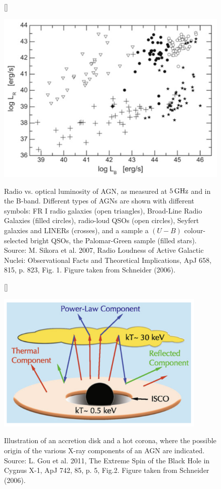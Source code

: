 \documentclass[a4paper,11pt]{article}
\begin{document}
\begin{figure}[h]
    [\FBwidth]
    {\caption{\footnotesize{Radio vs. optical luminosity of AGN, as measured at $5\,{\rm GHz}$ and in the B-band. Different types of AGNs are shown with different symbols: FR I radio galaxies (open triangles), Broad-Line Radio Galaxies (filled circles), radio-loud QSOs (open circles), Seyfert galaxies and LINERs (crosses), and a sample a $(U-B)$ colour-selected bright QSOs, the Palomar-Green sample (filled stars). Source: M. Sikora et al. 2007, Radio Loudness of Active Galactic Nuclei: Observational Facts and Theoretical Implications, ApJ 658, 815, p. 823, Fig. 1. Figure taken from Schneider (2006).}}
    \label{fig:qsoradiovsoptical}}
    {\includegraphics[width=12cm]{figures/QSO_radiovsoptical.png}}
\end{figure}

\begin{figure}[h]
    [\FBwidth]
    {\caption{\footnotesize{Illustration of an accretion disk and a hot corona, where the possible origin of the various X-ray components of an AGN are indicated. Source: L. Gou et al. 2011, The Extreme Spin of the Black Hole in Cygnus X-1, ApJ 742, 85, p. 5, Fig.2. Figure taken from Schneider (2006).}}
    \label{fig:agnaccretion}}
    {\includegraphics[width=10cm]{figures/AGN_accretion.png}}
\end{figure}
\end{document}

